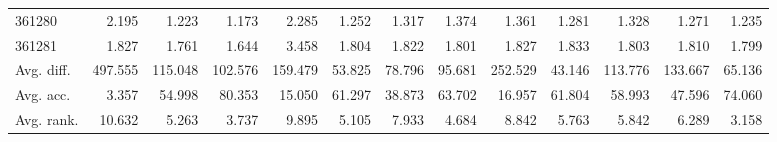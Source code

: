 \begin{tabular}{lrrrrrrrrrrrr}
361280 & 2.195 & 1.223 & 1.173 & 2.285 & 1.252 & 1.317 & 1.374 & 1.361 & 1.281 & 1.328 & 1.271 & 1.235 \\
361281 & 1.827 & 1.761 & 1.644 & 3.458 & 1.804 & 1.822 & 1.801 & 1.827 & 1.833 & 1.803 & 1.810 & 1.799 \\
Avg. diff. & 497.555 & 115.048 & 102.576 & 159.479 & 53.825 & 78.796 & 95.681 & 252.529 & 43.146 & 113.776 & 133.667 & 65.136 \\
Avg. acc. & 3.357 & 54.998 & 80.353 & 15.050 & 61.297 & 38.873 & 63.702 & 16.957 & 61.804 & 58.993 & 47.596 & 74.060 \\
Avg. rank. & 10.632 & 5.263 & 3.737 & 9.895 & 5.105 & 7.933 & 4.684 & 8.842 & 5.763 & 5.842 & 6.289 & 3.158 \\
\bottomrule
\end{tabular}
